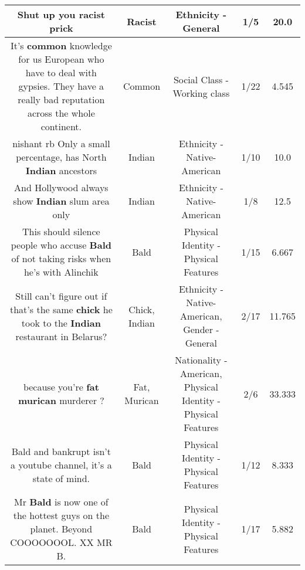 \documentclass[11pt]{article}
\newlength\mylength
\begin{document}
\begin{center}
\begin{longtable}{|C{.65\mylength}|C{.30\mylength}|C{.12\mylength}|C{.12\mylength}|C{.12\mylength}|}
  \small Shut up you \textbf{racist} prick\normalsize   & Racist & Ethnicity - General & 1/5 & 20.0 \\  \hline
  \small It's \textbf{common} knowledge for us European who have to deal with gypsies. They have a really bad reputation across the whole continent.\normalsize   & Common & Social Class - Working class & 1/22 & 4.545 \\  \hline
  \small nishant rb Only a small percentage, has North \textbf{Indian} ancestors\normalsize   & Indian & Ethnicity - Native-American & 1/10 & 10.0 \\  \hline
  \small And Hollywood always show \textbf{Indian} slum area only\normalsize   & Indian & Ethnicity - Native-American & 1/8 & 12.5 \\  \hline
  \small This should silence people who accuse \textbf{Bald} of not taking risks when he's with Alinchik\normalsize   & Bald & Physical Identity - Physical Features & 1/15 & 6.667 \\  \hline
  \small Still can't figure out if that's the same \textbf{chick} he took to the \textbf{Indian} restaurant in Belarus?\normalsize   & Chick, Indian & Ethnicity - Native-American, Gender - General & 2/17 & 11.765 \\  \hline
  \small because you're \textbf{fat} \textbf{murican} murderer ?\normalsize   & Fat, Murican & Nationality - American, Physical Identity - Physical Features & 2/6 & 33.333 \\  \hline
  \small Bald and bankrupt isn't a youtube channel, it's a state of mind.\normalsize   & Bald & Physical Identity - Physical Features & 1/12 & 8.333 \\  \hline
  \small Mr \textbf{Bald} is now one of the hottest guys on the planet. Beyond COOOOOOOL. XX MR B.\normalsize   & Bald & Physical Identity - Physical Features & 1/17 & 5.882 \\  \hline

\end{longtable}
\end{center}
\end{document}
